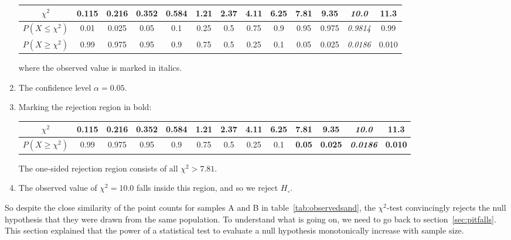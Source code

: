 \begin{enumerate}
  \begin{center}
    \begin{tabular}{c|c@{\gap}c@{\gap}c@{\gap}c@{\gap}
        c@{\gap}c@{\gap}c@{\gap}c@{\gap}c@{\gap}c@{\gap}c@{\gap}c}
      $\chi^2$ & 0.115 & 0.216 & 0.352 & 0.584 & 1.21 & 2.37 &
      4.11 & 6.25 & 7.81 & 9.35 & \textit{10.0} & 11.3 \\ \hline
      $P(X\leq{\chi^2})$ & 0.01 & 0.025 & 0.05 & 0.1 & 0.25 &
      0.5 & 0.75 & 0.9 & 0.95 & 0.975 & \textit{0.9814} & 0.99 \\
      $P(X\geq{\chi^2})$ & 0.99 & 0.975 & 0.95 & 0.9 & 0.75 & 0.5 &
      0.25 & 0.1 & 0.05 & 0.025 & \textit{0.0186} & 0.010
    \end{tabular}
  \end{center}

  \noindent where the observed value is marked in italics.
  
\item The confidence level $\alpha = 0.05$.

\item Marking the rejection region in bold:
  
  \begin{center}
    \begin{tabular}{c|c@{\gap}c@{\gap}c@{\gap}c@{\gap}
        c@{\gap}c@{\gap}c@{\gap}c@{\gap}c@{\gap}c@{\gap}c@{\gap}c}
      $\chi^2$ & 0.115 & 0.216 & 0.352 & 0.584 & 1.21 & 2.37 &
      4.11 & 6.25 & \textbf{7.81} & \textbf{9.35} &
      \textbf{\textit{10.0}} & \textbf{11.3} \\ \hline
      $P(X\geq{\chi^2})$ & 0.99 & 0.975 & 0.95 & 0.9 & 0.75 & 0.5 &
      0.25 & 0.1 & \textbf{0.05} & \textbf{0.025} &
      \textbf{\textit{0.0186}} & \textbf{0.010}
    \end{tabular}
  \end{center}

  The one-sided rejection region consists of all $\chi^2>{7.81}$.

\item The observed value of $\chi^2=10.0$ falls inside this region,
  and so we reject $H_\circ$.

\end{enumerate}

So despite the close similarity of the point counts for samples A and
B in table~\ref{tab:observedsand}, the $\chi^2$-test convincingly
rejects the null hypothesis that they were drawn from the same
population. To understand what is going on, we need to go back to
section~\ref{sec:pitfalls}. This section explained that the power of a
statistical test to evaluate a null hypothesis monotonically increase
with sample size.\\


